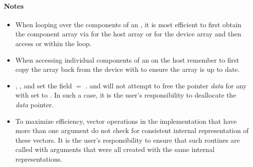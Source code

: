 \paragraph{\bf Notes}                                                      
           
\begin{itemize}
                                        
\item
  When looping over the components of an  , it is     
  most efficient to first obtain the component array via       
   for the host array or \newline
   for the device array and then access
   or  within the loop.

\item
  When accessing individual components of an   on
  the host remember to first copy the array
  back from the device with 
  to ensure the array is up to date.

\item
  {\warn}, , 
  and  set the field 
   $=$ . 
   and 
  will not attempt to free the pointer {\em data} for any  with
   set to . In such a case, it is the user's responsibility to
  deallocate the {\em data} pointer.
                                     
\item
  {\warn}To maximize efficiency, vector operations in the {\nvecopenmpdev} implementation
  that have more than one  argument do not check for
  consistent internal representation of these vectors. It is the user's 
  responsibility to ensure that such routines are called with 
  arguments that were all created with the same internal representations.

\end{itemize}
